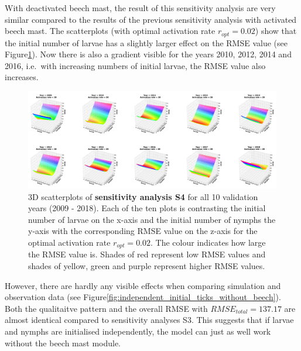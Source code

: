 \documentclass[a4paper, 11pt]{scrartcl}
\begin{document}
With deactivated beech mast, the result of this sensitivity analysis are very similar compared to the results of the previous sensitivity analysis with activated beech mast.
The scatterplots (with optimal activation rate $r_{opt}= 0.02$) show that the initial number of larvae has a slightly larger effect on the RMSE value (see
Figure\ref{fig:independent_initial_ticks_without_beech_error}). Now there is also a gradient visible for the years 2010, 2012, 2014 and 2016, i.e.\ with increasing numbers of
initial larvae, the RMSE value also increases.

\begin{figure}[h!]
\centering
\includegraphics[width=\linewidth]{figures/independent_initial_ticks_without_beech_error}
\caption{3D scatterplots of \textbf{sensitivity analysis S4} for all 10 validation years (2009 - 2018). Each of the ten plots is contrasting the initial number of larvae on the
x-axis and the initial number of nymphs the y-axis with the corresponding RMSE value on the z-axis for the optimal activation rate $r_{opt} = 0.02$. The colour indicates how large
the RMSE value is. Shades of red represent low RMSE values and shades of yellow, green and purple represent higher RMSE values.}
\label{fig:independent_initial_ticks_without_beech_error}
\end{figure}

However, there are hardly any visible effects when comparing simulation and observation data (see Figure\ref{fig:independent_initial_ticks_without_beech}). Both the qualitaitve
pattern and the overall RMSE with $RMSE_{total} = 137.17$ are almost identical compared to sensitivity analyses S3. This suggests that if larvae and nymphs are
initialised independently, the model can just as well work without the beech mast module.
\end{document}
